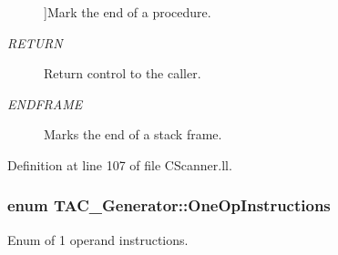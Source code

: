 \begin{Desc}
\begin{description}
{}]Mark the end of a procedure. \item[{\em 
\hypertarget{classTAC__Generator_a3942f3e280fb83e44ad85eb13d56dfb5a0e868fa94bac0750a62dfa98d0f56510}{R\-E\-T\-U\-R\-N}\label{classTAC__Generator_a3942f3e280fb83e44ad85eb13d56dfb5a0e868fa94bac0750a62dfa98d0f56510}
}]Return control to the caller. \item[{\em 
\hypertarget{classTAC__Generator_a3942f3e280fb83e44ad85eb13d56dfb5a77c34b42184355e533cdb9105a1c779a}{E\-N\-D\-F\-R\-A\-M\-E}\label{classTAC__Generator_a3942f3e280fb83e44ad85eb13d56dfb5a77c34b42184355e533cdb9105a1c779a}
}]Marks the end of a stack frame. \end{description}
\end{Desc}


Definition at line 107 of file C\-Scanner.\-ll.

\hypertarget{classTAC__Generator_ab58b7044cb5d16a454f4e01514175123}{
\subsubsection[{One\-Op\-Instructions}]{\setlength{\rightskip}{0pt plus 5cm}enum {\bf T\-A\-C\-\_\-\-Generator\-::\-One\-Op\-Instructions}}}\label{classTAC__Generator_ab58b7044cb5d16a454f4e01514175123}


Enum of 1 operand instructions. 

